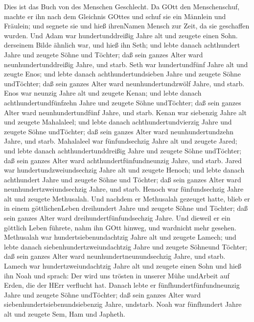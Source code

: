  Dies ist das Buch von des Menschen Geschlecht. Da GOtt den
Menschenschuf, machte er ihn nach dem Gleichnis GOttes  und
schuf sie ein Männlein und Fräulein; und segnete sie und hieß ihrenNamen
Mensch zur Zeit, da sie geschaffen wurden.  Und Adam war
hundertunddreißig Jahre alt und zeugete einen Sohn. derseinem Bilde
ähnlich war, und hieß ihn Seth;  und lebte danach
achthundert Jahre und zeugete Söhne und Töchter;  daß sein
ganzes Alter ward neunhundertunddreißig Jahre, und starb. 
Seth war hundertundfünf Jahre alt und zeugte Enos;  und
lebte danach achthundertundsieben Jahre und zeugete Söhne undTöchter;
 daß sein ganzes Alter ward neunhundertundzwölf Jahre, und
starb.  Enos war neunzig Jahre alt und zeugete Kenan;
 und lebte danach achthundertundfünfzehn Jahre und zeugete
Söhne undTöchter;  daß sein ganzes Alter ward
neunhundertundfünf Jahre, und starb.  Kenan war siebenzig
Jahre alt und zeugete Mahalaleel;  und lebte danach
achthundertundvierzig Jahre und zeugete Söhne undTöchter; 
daß sein ganzes Alter ward neunhundertundzehn Jahre, und starb.
 Mahalaleel war fünfundsechzig Jahre alt und zeugete Jared;
 und lebte danach achthundertunddreißig Jahre und zeugete
Söhne undTöchter;  daß sein ganzes Alter ward
achthundertfünfundneunzig Jahre, und starb.  Jared war
hundertundzweiundsechzig Jahre alt und zeugete Henoch;  und
lebte danach achthundert Jahre und zeugete Söhne und Töchter;
 daß sein ganzes Alter ward neunhundertzweiundsechzig
Jahre, und starb.  Henoch war fünfundsechzig Jahre alt und
zeugete Methusalah.  Und nachdem er Methusalah gezeuget
hatte, blieb er in einem göttlichenLeben dreihundert Jahre und zeugete
Söhne und Töchter;  daß sein ganzes Alter ward
dreihundertfünfundsechzig Jahre.  Und dieweil er ein
göttlich Leben führete, nahm ihn GOtt hinweg, und wardnicht mehr
gesehen.  Methusalah war hundertsiebenundachtzig Jahre alt
und zeugete Lamech;  und lebte danach
siebenhundertzweiundachtzig Jahre und zeugete Söhneund Töchter;
 daß sein ganzes Alter ward neunhundertneunundsechzig
Jahre, und starb.  Lamech war hundertzweiundachtzig Jahre
alt und zeugete einen Sohn  und hieß ihn Noah und sprach:
Der wird uns trösten in unserer Mühe undArbeit auf Erden, die der HErr
verflucht hat.  Danach lebte er fünfhundertfünfundneunzig
Jahre und zeugete Söhne undTöchter;  daß sein ganzes Alter
ward siebenhundertsiebenundsiebenzig Jahre, undstarb.  Noah
war fünfhundert Jahre alt und zeugete Sem, Ham und Japheth.

